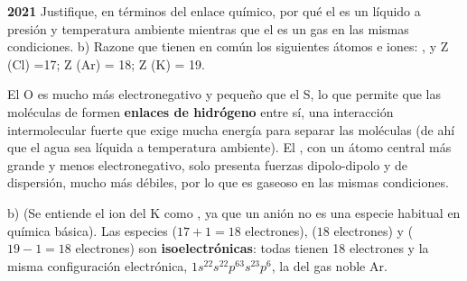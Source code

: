 \begin{exerciseEVAU}
    \textbf{2021} Justifique, en términos del enlace químico, por qué el  es un líquido a presión y temperatura ambiente mientras que el  es un gas en las mismas condiciones. b) Razone que tienen en común los siguientes átomos e iones: ,  y 
    \datos{} Z (Cl) =17; Z (Ar) = 18; Z (K) = 19.

    \begin{solu}


        El O es mucho más electronegativo y pequeño que el S, lo que permite que las moléculas de  formen \textbf{enlaces de hidrógeno} entre sí, una interacción intermolecular fuerte que exige mucha energía para separar las moléculas (de ahí que el agua sea líquida a temperatura ambiente). El , con un átomo central más grande y menos electronegativo, solo presenta fuerzas dipolo-dipolo y de dispersión, mucho más débiles, por lo que es gaseoso en las mismas condiciones.

        b) (Se entiende el ion del K como , ya que un anión  no es una especie habitual en química básica). Las especies  (\(17+1=18\) electrones),  (\(18\) electrones) y  (\(19-1=18\) electrones) son \textbf{isoelectrónicas}: todas tienen 18 electrones y la misma configuración electrónica, \( 1s^22s^22p^63s^23p^6 \), la del gas noble Ar.
    \end{solu}
\end{exerciseEVAU}
